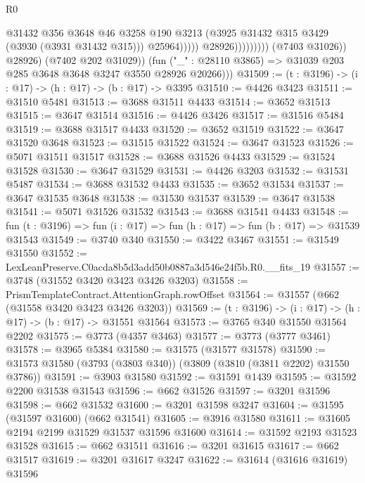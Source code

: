 \begin{lexlean}{R0}
\begin{coremodule}
                                          @31432
                                          @356
                                          @3648
                                          @46
                                          @3258
                                          @190
                                          @3213
                                          (@3925 @31432 @315 @3429 (@3930 (@3931 @31432 @315)))
                                          @25964)))))
                                @28926)))))))))
              (@7403 @31026))
            @28926)
          (@7402 @202 @31029))
        (fun ("_" : @28110 @3865) => @31039 @203 @285 @3648 @3648 @3247 @3550 @28926 @20266)))
@31509 := (t : @3196) -> (i : @17) -> (h : @17) -> (b : @17) -> @3395
@31510 := @4426 @3423
@31511 := @31510 @5481
@31513 := @3688 @31511 @4433
@31514 := @3652 @31513
@31515 := @3647 @31514
@31516 := @4426 @3426
@31517 := @31516 @5484
@31519 := @3688 @31517 @4433
@31520 := @3652 @31519
@31522 := @3647 @31520 @3648
@31523 := @31515 @31522
@31524 := @3647 @31523
@31526 := @5071 @31511 @31517
@31528 := @3688 @31526 @4433
@31529 := @31524 @31528
@31530 := @3647 @31529
@31531 := @4426 @3203
@31532 := @31531 @5487
@31534 := @3688 @31532 @4433
@31535 := @3652 @31534
@31537 := @3647 @31535 @3648
@31538 := @31530 @31537
@31539 := @3647 @31538
@31541 := @5071 @31526 @31532
@31543 := @3688 @31541 @4433
@31548 := fun (t : @3196) => fun (i : @17) => fun (h : @17) => fun (b : @17) => @31539 @31543
@31549 := @3740 @340
@31550 := @3422 @3467
@31551 := @31549 @31550
@31552 := LexLeanPreserve.C0acda8b5d3add50b0887a3d546e24f5b.R0.__fits_19
@31557 := @3748 (@31552 @3420 @3423 @3426 @3203)
@31558 := PrismTemplateContract.AttentionGraph.rowOffset
@31564 := @31557 (@662 (@31558 @3420 @3423 @3426 @3203))
@31569 := (t : @3196) -> (i : @17) -> (h : @17) -> (b : @17) -> @31551 @31564
@31573 := @3765 @340 @31550 @31564 @2202
@31575 := @3773 (@4357 @3463)
@31577 := @3773 (@3777 @3461)
@31578 := @3965 @5384
@31580 := @31575 (@31577 @31578)
@31590 := @31573 @31580 (@3793 (@3803 @340)) (@3809 (@3810 (@3811 @2202) @31550 @3786))
@31591 := @3903 @31580
@31592 := @31591 @1439
@31595 := @31592 @2200 @31538 @31543
@31596 := @662 @31526
@31597 := @3201 @31596
@31598 := @662 @31532
@31600 := @3201 @31598 @3247
@31604 := @31595 (@31597 @31600) (@662 @31541)
@31605 := @3916 @31580
@31611 := @31605 @2194 @2199 @31529 @31537 @31596 @31600
@31614 := @31592 @2193 @31523 @31528
@31615 := @662 @31511
@31616 := @3201 @31615
@31617 := @662 @31517
@31619 := @3201 @31617 @3247
@31622 := @31614 (@31616 @31619) @31596

\end{coremodule}
\end{lexlean}
